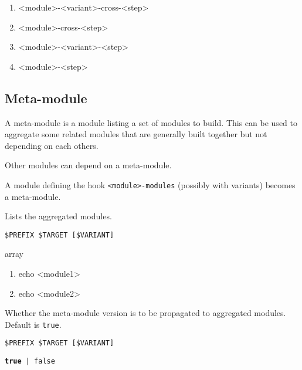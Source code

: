 \documentclass[a4paper,12pt,twoside]{article}
\newcommand{\code}[1]{\texttt{#1}}
\begin{document}
\begin{enumerate}
	\item <module>-<variant>-cross-<step>
	\item <module>-cross-<step>
	\item <module>-<variant>-<step>
	\item <module>-<step>
\end{enumerate}

\subsection{Meta-module}
\label{meta-module}

A meta-module is a module listing a set of modules to build. This can be used to aggregate some related modules that are generally built together but not depending on each others.

Other modules can depend on a meta-module.

A module defining the hook \code{<module>-modules} (possibly with variants) becomes a meta-module.

\begin{description}[style=nextline]
	\item[<module>{[}-common|<variant>{]}-modules] Lists the aggregated modules.
		\begin{description}[font=\textit,style=standard]
			\item[parameter] \tabto{2cm} \code{\$PREFIX \$TARGET [\$VARIANT]}
			\item[return] \tabto{2cm} array
				\begin{enumerate}
					\item echo <module1>
					\item echo <module2>
		\end{enumerate}
	\end{description}
	\item[<module>{[}-<variant>{]}-propagate-version] \label{propagate-version}Whether the meta-module version is to be propagated to aggregated modules. Default is \code{true}.
		\begin{description}[font=\textit,style=standard]
			\item[parameter] \tabto{2cm} \code{\$PREFIX \$TARGET [\$VARIANT]}
			\item[return] \tabto{2cm} \code{\textbf{true} | false}
		\end{description}
\end{description}
\end{document}
